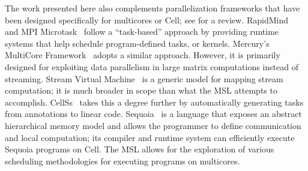 The work presented here also complements parallelization frameworks
that have been designed specifically for multicores or Cell; see
\cite{cell:pf} for a review. RapidMind~\cite{rapidmind} and MPI
Microtask~\cite{mpimicrotask} follow a
``task-based'' approach by providing runtime systems that help
schedule program-defined tasks, or kernels. Mercury's MultiCore
Framework~\cite{mcf} adopts a similar approach. However, it is
primarily designed for exploiting data parallelism in large matrix computations instead of streaming. Stream Virtual Machine~\cite{svm} is a generic model for mapping stream computation; it is much broader in scope than what the MSL attempts to accomplish.
CellSs~\cite{cellss} takes
this a degree further by automatically generating tasks from
annotations to linear code. Sequoia~\cite{sequoia} is a language that exposes an abstract hierarchical memory model and allows the programmer to define communication and local computation; its compiler and runtime system can efficiently execute Sequoia programs on Cell. The MSL allows for the exploration of
various scheduling methodologies for executing programs on multicores.

